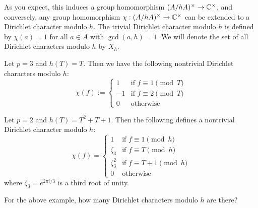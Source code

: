 As you expect, this induces a group homomorphism $(A / hA)^\times \to \mathbb{C}^\times$, and conversely, any group homomorphism $\chi: (A / hA)^\times \to \mathbb{C}^\times$ can be extended to a Dirichlet character modulo $h$.
The trivial Dirichlet character modulo $h$ is defined by $\chi(a) = 1$ for all $a \in A$ with $\gcd(a, h) = 1$.
We will denote the set of all Dirichlet characters modulo $h$ by $X_h$.

\begin{example}
    \label{ex:dirichlet-character1}
    Let $p = 3$ and $h(T) = T$.
    Then we have the following nontrivial Dirichlet characters modulo $h$:    
    \[
    \chi(f) := \begin{cases}
        1 & \text{if } f \equiv 1 \pmod{T} \\
        -1 & \text{if } f \equiv 2 \pmod{T} \\
        0 & \text{otherwise}
    \end{cases}
    \]
\end{example}

\begin{example}
    \label{ex:dirichlet-character2}
    Let $p = 2$ and $h(T) = T^2 + T + 1$.
    Then the following defines a nontrivial Dirichlet character modulo $h$:
    \[
    \chi(f) = \begin{cases}
        1 & \text{if } f \equiv 1 \pmod{h} \\
        \zeta_3 & \text{if } f \equiv T \pmod{h} \\
        \zeta_3^2 & \text{if } f \equiv T + 1 \pmod{h} \\
        0 & \text{otherwise}
    \end{cases}
    \]
    where $\zeta_3 = e^{2\pi i / 3}$ is a third root of unity.
\end{example}

\begin{exercise}
    For the above example, how many Dirichlet characters modulo $h$ are there?
\end{exercise}

